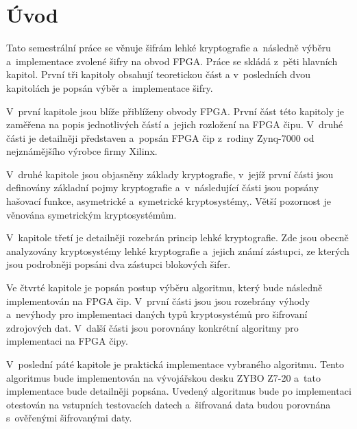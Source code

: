 \chapter*{Úvod}
{}
Tato semestrální práce se věnuje šifrám lehké kryptografie a~následně výběru a~implementace zvolené šifry na obvod FPGA. Práce se skládá z~pěti hlavních kapitol. První tři kapitoly obsahují teoretickou část a v~posledních dvou kapitolách je popsán výběr a~implementace šifry. 

V~první kapitole jsou blíže přiblíženy obvody FPGA. První část této kapitoly je zaměřena na popis jednotlivých částí a~jejich rozložení na FPGA čipu. V~druhé části je detailněji představen a~popsán FPGA čip z~rodiny Zynq-7000 od nejznámějšího výrobce firmy Xilinx.

V~druhé kapitole jsou objasněny základy kryptografie, v~jejíž první části jsou definovány základní pojmy kryptografie a~v~následující části jsou popsány hašovací funkce, asymetrické a~symetrické kryptosystémy,. Větší pozornost je věnována symetrickým kryptosystémům.

V~kapitole třetí je detailněji rozebrán princip lehké kryptografie. Zde jsou obecně analyzovány kryptosystémy lehké kryptografie a~jejich známí zástupci, ze kterých jsou podrobněji popsáni dva zástupci blokových šifer.

Ve čtvrté kapitole je popsán postup výběru algoritmu, který bude následně implementován na FPGA čip. V~první části jsou jsou rozebrány výhody a~nevýhody pro implementaci daných typů kryptosystémů pro šifrovaní zdrojových dat. V~další části jsou porovnány konkrétní algoritmy pro implementaci na FPGA čipy.

V~poslední páté kapitole je praktická implementace vybraného algoritmu. Tento algoritmus bude implementován na vývojářskou desku ZYBO Z7-20 a~tato implementace bude detailněji popsána. Uvedený algoritmus bude po implementaci otestován na vstupních testovacích datech a~šifrovaná data budou porovnána s~ověřenými šifrovanými daty.

